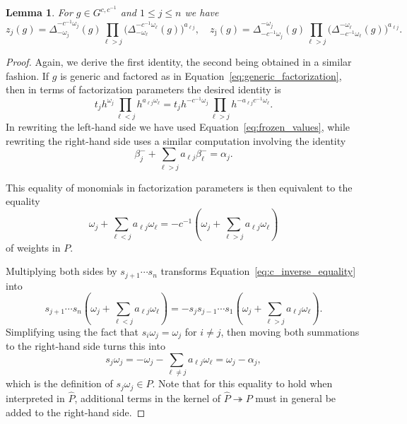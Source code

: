 \documentclass[12pt]{amsart}
\newcommand\onto{\twoheadrightarrow}
\newcommand{\ol}[1]{\overline{#1}}
\newcommand{\cvar}{z}
\newtheorem{lemma}[theorem]{Lemma}
\theoremstyle{remark}
\numberwithin{equation}{section}
\numberwithin{figure}{section}
\begin{document}
\begin{lemma}
  \label{lemma:coefficients_identities}
  For $g \in G^{c,c^{-1}}$ and $1 \leq j \leq n$ we have
  \begin{equation*}
    \cvar_j(g)
    =
    \Delta_{-\omega_j}^{-c^{-1}\omega_j}(g)
    \prod_{\ell>j}\Big(\Delta_{-\omega_\ell}^{-c^{-1}\omega_\ell}(g)\Big)^{a_{\ell j}},
    \quad
    \cvar_{\ol{\jmath}}(g)
    =
    \Delta_{-c^{-1}\omega_j}^{-\omega_j}(g)
    \prod_{\ell>j}\Big(\Delta_{-c^{-1}\omega_\ell}^{-\omega_\ell}(g)\Big)^{a_{\ell j}}.
  \end{equation*}
\end{lemma}
\begin{proof}
  Again, we derive the first identity, the second being obtained in a similar fashion.
  If $g$ is generic and factored as in Equation~\eqref{eq:generic_factorization}, then in terms of factorization parameters the desired identity is
  \begin{equation}
    t_j  h^{\omega_j} \prod_{\ell<j}h^{a_{\ell j}\omega_\ell}
    =
    t_j  h^{-c^{-1}\omega_j} \prod_{\ell>j}h^{-a_{\ell j}c^{-1}\omega_\ell}.
  \end{equation}
  In rewriting the left-hand side we have used Equation~\eqref{eq:frozen_values}, while rewriting the right-hand side uses a similar computation involving the identity
  \[
    \beta_j^-+\sum_{\ell>j}a_{\ell j}\beta_\ell^-
    =
    \alpha_j.
  \]

  This equality of monomials in factorization parameters is then equivalent to the equality
  \begin{equation}
    \label{eq:c_inverse_equality}
    \omega_j + \sum_{\ell<j} a_{\ell j}\omega_\ell
    =
    -c^{-1}\left(\omega_j + \sum_{\ell>j} a_{\ell j}\omega_\ell\right)
  \end{equation}
  of weights in $P$.

  Multiplying both sides by $s_{j+1}\cdots s_n$ transforms Equation~\eqref{eq:c_inverse_equality} into
  \[
    s_{j+1}\cdots s_n\left(\omega_j + \sum_{\ell<j} a_{\ell j}\omega_\ell\right)
    =
    -s_js_{j-1}\cdots s_1\left(\omega_j + \sum_{\ell>j} a_{\ell j}\omega_\ell\right).
  \]
  Simplifying using the fact that $s_i\omega_j=\omega_j$ for $i\neq j$, then moving both summations to the right-hand side turns this into
  \begin{equation}
    s_j\omega_j
    =
    -\omega_j-\sum_{\ell\neq j}a_{\ell j}\omega_\ell
    =
    \omega_j-\alpha_j,
  \end{equation}
  which is the definition of $s_j\omega_j \in P$.
  Note that for this equality to hold when interpreted in $\widehat{P}$, additional terms in the kernel of $\widehat{P} \onto P$ must in general be added to the right-hand side.
\end{proof}
\end{document}
